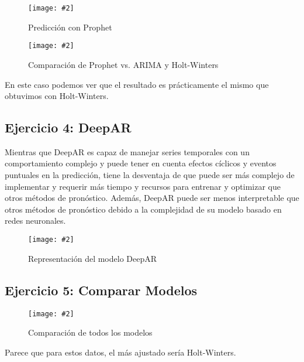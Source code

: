 \documentclass[
12pt, 
spanish, 
singlespacing,
headsepline
]{article}
\newcommand{\image}[2]{
\begin{figure}[H]
	\caption{#1}
	\centering
	\texttt{[image: \#2]}
\end{figure}
}
\begin{document}
\image{Predicción con Prophet}{PL8/prophet.png}

\image{Comparación de Prophet vs. ARIMA y Holt-Winters}{PL8/arimaVholtVprophet.png}

En este caso podemos ver que el resultado es prácticamente el mismo que obtuvimos con Holt-Winters.

\subsection{Ejercicio 4: DeepAR}
Mientras que DeepAR es capaz de manejar series temporales con un comportamiento complejo y puede tener en cuenta efectos cíclicos y eventos puntuales en la predicción, tiene la desventaja de que puede ser más complejo de implementar y requerir más tiempo y recursos para entrenar y optimizar que otros métodos de pronóstico. Además, DeepAR puede ser menos interpretable que otros métodos de pronóstico debido a la complejidad de su modelo basado en redes neuronales.

\image{Representación del modelo DeepAR}{PL8/deepar.png}

\subsection{Ejercicio 5: Comparar Modelos}
\image{Comparación de todos los modelos}{PL8/all.png}

Parece que para estos datos, el más ajustado sería Holt-Winters.
\end{document}
